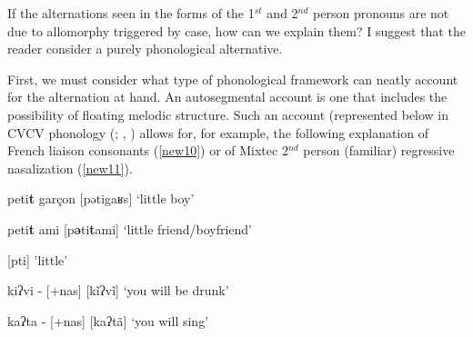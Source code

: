 \documentclass[output=paper,colorlinks,citecolor=brown,
]{langscibook}
\begin{document}
If the alternations seen in the forms of the 1$^{st}$ and 2$^{nd}$ person pronouns are not due to allomorphy triggered by case, how can we explain them? I suggest that the reader consider a purely phonological alternative. 

First, we must consider what type of phonological framework can neatly account for the alternation at hand. An autosegmental account is one that includes the possibility of floating melodic structure. Such an account (represented below in CVCV phonology (\citealt{lowenstamm1996cv}; \citealt{scheer2004lateral}, \citeyear{scheer2009external}) allows for, for example, the following explanation of French liaison consonants (\ref{new10}) or of Mixtec 2$^{nd}$ person (familiar) regressive nasalization (\ref{new11}).

\begin{exe}
\ex \label{new10}
\begin{xlist}
\ex \label{new10a}
peti\textbf{t} garçon \hspace{2cm}	[pətigaʁs\textbf{}]	\hspace{1.25cm}	‘little boy’ 

\ex \label{new10b}
peti\textbf{t} ami	\hspace{2.55cm}    [p\textbf{ə}ti\textbf{t}ami]       \hspace{1.5cm}	‘little friend/boyfriend’

\ex \label{new10c}
\hspace{4cm} [p{\textschwa}ti]  \hspace{2.25cm} 'little' \\
{} 

\end{xlist}
\end{exe}

\begin{exe}
\ex \label{new11}
\begin{xlist}
\ex \label{new11a}
kiʔvi - [+nas] 		\hspace{2cm}	[kĩʔvĩ]      \hspace{2cm}    		‘you will be drunk’

{\ex \label{new11b}
kaʔta - [+nas] 		\hspace{2cm}	[kaʔtã]	        \hspace{2cm} 		‘you will sing’} 

\end{xlist}
\end{exe}
\end{document}
